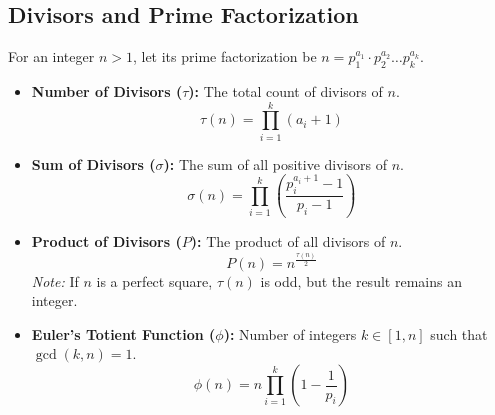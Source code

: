 \subsection{Divisors and Prime Factorization}

For an integer $n > 1$, let its prime factorization be $n = p_1^{a_1} \cdot p_2^{a_2} \dots p_k^{a_k}$.

\begin{itemize}
    \item \textbf{Number of Divisors ($\tau$):}
          The total count of divisors of $n$.
          \[ \tau(n) = \prod_{i=1}^{k} (a_i + 1) \]

    \item \textbf{Sum of Divisors ($\sigma$):}
          The sum of all positive divisors of $n$.
          \[ \sigma(n) = \prod_{i=1}^{k} \left( \frac{p_i^{a_i+1} - 1}{p_i - 1} \right) \]

    \item \textbf{Product of Divisors ($P$):}
          The product of all divisors of $n$.
          \[ P(n) = n^{\frac{\tau(n)}{2}} \]
          \textit{Note:} If $n$ is a perfect square, $\tau(n)$ is odd, but the result remains an integer.

    \item \textbf{Euler's Totient Function ($\phi$):}
          Number of integers $k \in [1, n]$ such that $\gcd(k, n) = 1$.
          \[ \phi(n) = n \prod_{i=1}^{k} \left( 1 - \frac{1}{p_i} \right) \]
\end{itemize}